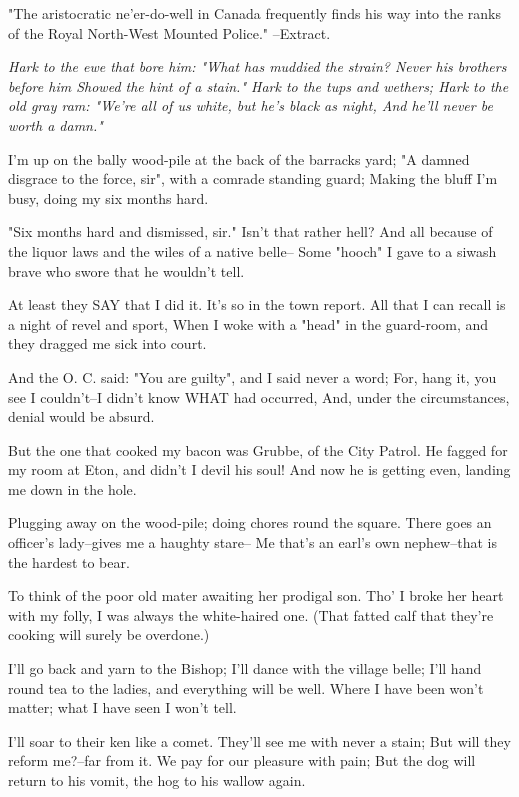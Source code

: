 
\begin{poemblock}
 "The aristocratic ne'er-do-well in Canada frequently finds his way
 into the ranks of the Royal North-West Mounted Police." --Extract.


\textit{
  Hark to the ewe that bore him:
   "What has muddied the strain?
  Never his brothers before him
   Showed the hint of a stain."
  Hark to the tups and wethers;
   Hark to the old gray ram:
  "We're all of us white, but he's black as night,
   And he'll never be worth a damn."
}

 I'm up on the bally wood-pile at the back of the barracks yard;
 "A damned disgrace to the force, sir", with a comrade standing guard;
 Making the bluff I'm busy, doing my six months hard.

 "Six months hard and dismissed, sir."  Isn't that rather hell?
 And all because of the liquor laws and the wiles of a native belle--
 Some "hooch" I gave to a siwash brave who swore that he wouldn't tell.

 At least they SAY that I did it.  It's so in the town report.
 All that I can recall is a night of revel and sport,
 When I woke with a "head" in the guard-room,
   and they dragged me sick into court.

 And the O. C. said:  "You are guilty", and I said never a word;
 For, hang it, you see I couldn't--I didn't know WHAT had occurred,
 And, under the circumstances, denial would be absurd.

 But the one that cooked my bacon was Grubbe, of the City Patrol.
 He fagged for my room at Eton, and didn't I devil his soul!
 And now he is getting even, landing me down in the hole.

 Plugging away on the wood-pile; doing chores round the square.
 There goes an officer's lady--gives me a haughty stare--
 Me that's an earl's own nephew--that is the hardest to bear.

 To think of the poor old mater awaiting her prodigal son.
 Tho' I broke her heart with my folly, I was always the white-haired one.
 (That fatted calf that they're cooking will surely be overdone.)

 I'll go back and yarn to the Bishop; I'll dance with the village belle;
 I'll hand round tea to the ladies, and everything will be well.
 Where I have been won't matter; what I have seen I won't tell.

 I'll soar to their ken like a comet.  They'll see me with never a stain;
 But will they reform me?--far from it.  We pay for our pleasure with pain;
 But the dog will return to his vomit, the hog to his wallow again.


\end{poemblock}
